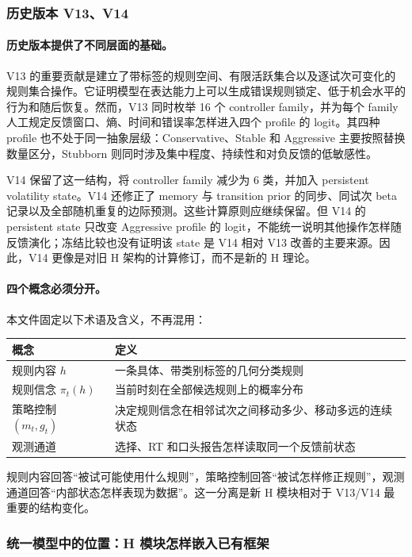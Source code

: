 \subsubsection{历史版本 V13、V14}

\paragraph{历史版本提供了不同层面的基础。}
V13 的重要贡献是建立了带标签的规则空间、有限活跃集合以及逐试次可变化的规则集合操作。它证明模型在表达能力上可以生成错误规则锁定、低于机会水平的行为和随后恢复。然而，V13 同时枚举 16 个 controller family，并为每个 family 人工规定反馈窗口、熵、时间和错误率怎样进入四个 profile 的 logit。其四种 profile 也不处于同一抽象层级：Conservative、Stable 和 Aggressive 主要按照替换数量区分，Stubborn 则同时涉及集中程度、持续性和对负反馈的低敏感性。

V14 保留了这一结构，将 controller family 减少为 6 类，并加入 persistent volatility state。V14 还修正了 memory 与 transition prior 的同步、同试次 beta 记录以及全部随机重复的边际预测。这些计算原则应继续保留。但 V14 的 persistent state 只改变 Aggressive profile 的 logit，不能统一说明其他操作怎样随反馈演化；冻结比较也没有证明该 state 是 V14 相对 V13 改善的主要来源。因此，V14 更像是对旧 H 架构的计算修订，而不是新的 H 理论。

\paragraph{四个概念必须分开。}
本文件固定以下术语及含义，不再混用：
\begin{center}
\small
\begin{tabular}{p{}|p{}}
\hline
概念 & 定义\\
\hline
规则内容 $h$ & 一条具体、带类别标签的几何分类规则\\
规则信念 $\pi_t(h)$ & 当前时刻在全部候选规则上的概率分布\\
策略控制 $(m_t,g_t)$ & 决定规则信念在相邻试次之间移动多少、移动多远的连续状态\\
观测通道 & 选择、RT 和口头报告怎样读取同一个反馈前状态\\
\hline
\end{tabular}
\normalsize
\end{center}
规则内容回答“被试可能使用什么规则”，策略控制回答“被试怎样修正规则”，观测通道回答“内部状态怎样表现为数据”。这一分离是新 H 模块相对于 V13/V14 最重要的结构变化。


\subsubsection{统一模型中的位置：H 模块怎样嵌入已有框架}

